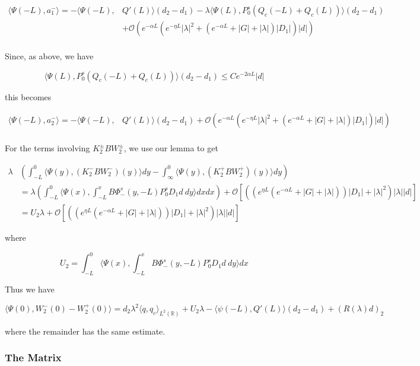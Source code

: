 \documentclass[12pt]{article}
\def\R{{\mathbb R}}
\begin{document}
\begin{align*}
\langle \Psi(-L), a_1^- \rangle = -\langle \Psi(-L), &Q'(L) \rangle (d_2 - d_1) - \lambda \langle \Psi(L), P_0^s (Q_c(-L) + Q_c(L))\rangle(d_2 - d_1) \\
&+ \mathcal{O} \left( e^{-\alpha L} (e^{-\eta L}|\lambda|^2 + (e^{-\alpha L} + |G| + |\lambda|)|D_1|)|d| \right)\\
\end{align*}

Since, as above, we have

\[
\langle \Psi(L), P_0^s (Q_c(-L) + Q_c(L))\rangle(d_2 - d_1) \leq C e^{-2 \alpha L} |d|
\]

this becomes

\begin{align*}
\langle \Psi(-L), a_2^- \rangle = -\langle \Psi(-L), &Q'(L) \rangle (d_2 - d_1) + \mathcal{O} \left( e^{-\alpha L} (e^{-\eta L}|\lambda|^2 + (e^{-\alpha L} + |G| + |\lambda|)|D_1|)|d| \right)\\
\end{align*}

For the terms involving $K_2^\pm B W_2^\pm$, we use our lemma to get

\begin{align*}
\lambda&\left( \int_{-L}^0 \langle \Psi(y), (K_2^- B W_2^-)(y) \rangle dy - \int_{\infty}^0 \langle \Psi(y), (K_2^+ B W_2^+)(y) \rangle dy \right) \\
&= \lambda \left( \int_{-L}^0 \langle \Psi(x), \int_{-L}^x B \Phi^s_-(y, -L) P_0^s D_1 d  \:dy \rangle dxdx \right) + \mathcal{O} \left[ \left(\left( e^{\eta L}(e^{-\alpha L} + |G| + |\lambda|) \right)|D_1| + |\lambda|^2 \right)|\lambda| |d|\right] \\
&= U_2 \lambda + \mathcal{O} \left[ \left(\left( e^{\eta L}(e^{-\alpha L} + |G| + |\lambda|) \right)|D_1| + |\lambda|^2 \right)|\lambda| |d|\right]
\end{align*}

where

\[
U_2 = \int_{-L}^0 \langle \Psi(x), \int_{-L}^x B \Phi^s_-(y, -L) P_0^s D_1 d  \:dy \rangle dx
\]

Thus we have

\[
\langle \Psi(0), W_2^-(0) - W_2^+(0) \rangle = 
d_2 \lambda^2 \langle q, q_c \rangle_{L^2(\R)} + U_2 \lambda - \langle \psi(-L), Q'(L) \rangle(d_2 - d_1) + (R(\lambda)d)_2
\]

where the remainder has the same estimate. 

\subsubsection*{The Matrix}
\end{document}
